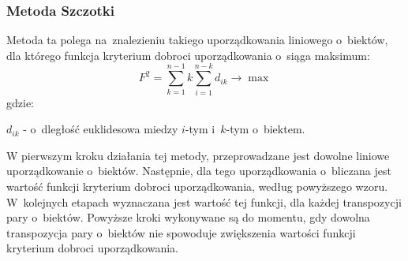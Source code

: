 \documentclass[12pt,a4paper]{report}
\begin{document}
\subsubsection{Metoda Szczotki}


Metoda ta polega na~znalezieniu takiego uporządkowania liniowego o~biektów, dla którego funkcja kryterium dobroci uporządkowania o~siąga maksimum:
$$
F^{2}=\sum_{k=1}^{n-1} k\sum_{i=1}^{n-k} d_{ik} \rightarrow     \max  
$$
gdzie:

$d_{ik}$ - o~dległość euklidesowa miedzy $i$-tym i~$k$-tym o~biektem.

W pierwszym kroku działania tej metody, przeprowadzane jest dowolne liniowe uporządkowanie o~biektów. Następnie, dla tego uporządkowania o~bliczana jest wartość funkcji kryterium dobroci uporządkowania, według powyższego wzoru. W~kolejnych etapach wyznaczana jest wartość tej funkcji, dla każdej transpozycji pary o~biektów. Powyższe kroki wykonywane są do momentu, gdy dowolna transpozycja pary o~biektów nie spowoduje zwiększenia wartości funkcji kryterium dobroci uporządkowania. 
\end{document}
